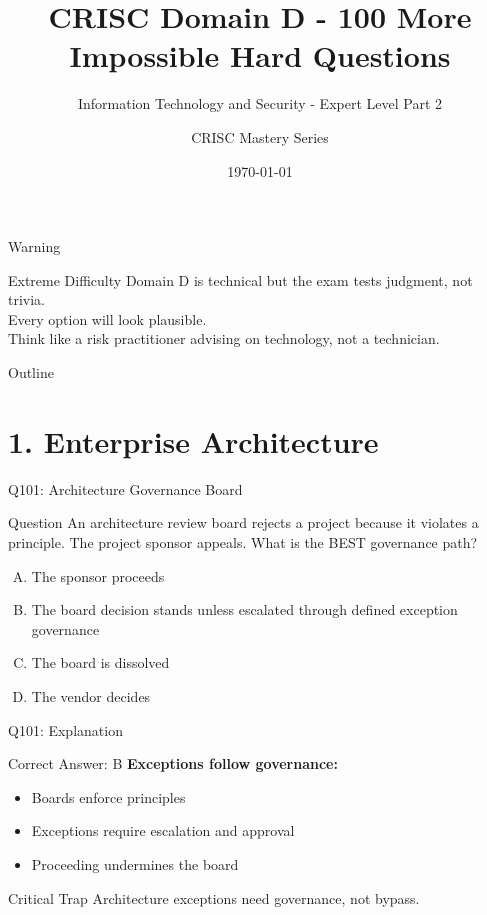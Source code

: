 \documentclass{beamer}
\title{CRISC Domain D - 100 More Impossible Hard Questions}
\subtitle{Information Technology and Security - Expert Level Part 2}
\author{CRISC Mastery Series}
\date{\today}
\begin{document}
	
	\begin{frame}
		\titlepage
	\end{frame}
	
	\begin{frame}{Warning}
		\begin{alertblock}{Extreme Difficulty}
			Domain D is technical but the exam tests judgment, not trivia.\\
			Every option will look plausible.\\
			Think like a risk practitioner advising on technology, not a technician.
		\end{alertblock}
	\end{frame}
	
	\begin{frame}{Outline}
		\tableofcontents
	\end{frame}
	
	\section{1. Enterprise Architecture}
	
	\begin{frame}{Q101: Architecture Governance Board}
		\begin{block}{Question}
			An architecture review board rejects a project because it violates a principle. The project sponsor appeals. What is the BEST governance path?
		\end{block}
		\begin{enumerate}[(A)]
			\item The sponsor proceeds
			\item The board decision stands unless escalated through defined exception governance
			\item The board is dissolved
			\item The vendor decides
		\end{enumerate}
	\end{frame}
	
	\begin{frame}{Q101: Explanation}
		\begin{block}{Correct Answer: B}
			\textbf{Exceptions follow governance:}
			\begin{itemize}
				\item Boards enforce principles
				\item Exceptions require escalation and approval
				\item Proceeding undermines the board
			\end{itemize}
		\end{block}
		\begin{alertblock}{Critical Trap}
			Architecture exceptions need governance, not bypass.
		\end{alertblock}
	\end{frame}
	
\end{document}
